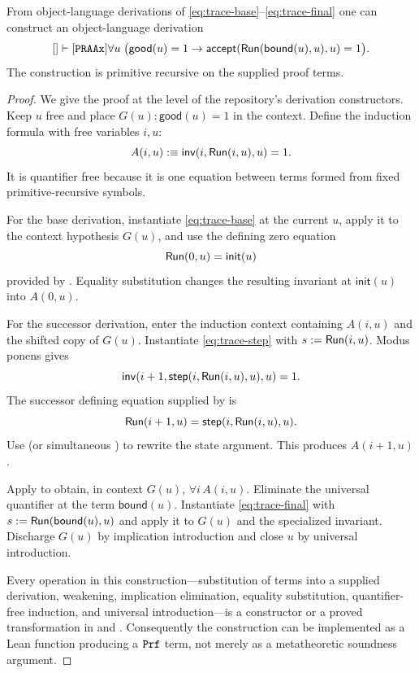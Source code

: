 \begin{theorem}
\label{thm:embedded-trace}
From object-language derivations of \eqref{eq:trace-base}--\eqref{eq:trace-final}
one can construct an object-language derivation
\[
 []\vdash[\texttt{PRAAx}]
 \forall u\;\bigl(
  \mathsf{good}(u)=1\to
  \mathsf{accept}(\mathsf{Run}(\mathsf{bound}(u),u),u)=1
 \bigr).
\]
The construction is primitive recursive on the supplied proof terms.
\end{theorem}

\begin{proof}
We give the proof at the level of the repository's derivation constructors.
Keep \(u\) free and place \(G(u):\mathsf{good}(u)=1\) in the context.  Define
the induction formula with free variables \(i,u\):
\[
 A(i,u):\equiv
 \mathsf{inv}(i,\mathsf{Run}(i,u),u)=1.
\]
It is quantifier free because it is one equation between terms formed from
fixed primitive-recursive symbols.

For the base derivation, instantiate \eqref{eq:trace-base} at the current
\(u\), apply it to the context hypothesis \(G(u)\), and use the defining
zero equation
\[
 \mathsf{Run}(0,u)=\mathsf{init}(u)
\]
provided by .  Equality substitution changes the resulting
invariant at \(\mathsf{init}(u)\) into \(A(0,u)\).

For the successor derivation, enter the induction context containing
\(A(i,u)\) and the shifted copy of \(G(u)\).  Instantiate
\eqref{eq:trace-step} with
\(s:=\mathsf{Run}(i,u)\).  Modus ponens gives
\[
 \mathsf{inv}(i+1,
   \mathsf{step}(i,\mathsf{Run}(i,u),u),u)=1.
\]
The successor defining equation supplied by  is
\[
 \mathsf{Run}(i+1,u)=\mathsf{step}(i,\mathsf{Run}(i,u),u).
\]
Use  (or simultaneous ) to rewrite the
state argument.  This produces \(A(i+1,u)\).

Apply  to obtain, in context \(G(u)\),
\(\forall i\,A(i,u)\).  Eliminate the universal quantifier at the term
\(\mathsf{bound}(u)\).  Instantiate \eqref{eq:trace-final} with
\(s:=\mathsf{Run}(\mathsf{bound}(u),u)\) and apply it to \(G(u)\) and the specialized
invariant.  Discharge \(G(u)\) by implication introduction and close \(u\) by
universal introduction.

Every operation in this construction---substitution of terms into a supplied
derivation, weakening, implication elimination, equality substitution,
quantifier-free induction, and universal introduction---is a constructor or a
proved transformation in  and
.  Consequently the construction can be implemented as a
Lean function producing a \(\texttt{Prf}\) term, not merely as a metatheoretic
soundness argument.
\end{proof}

